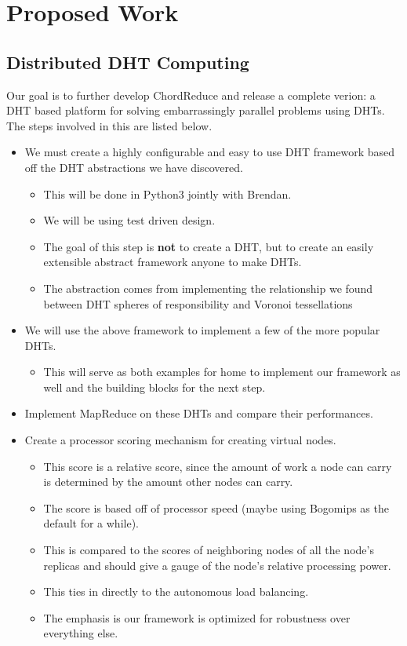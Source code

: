 \chapter{Proposed Work}
\label{chapter:experiments}

\section{Distributed DHT Computing}




Our goal is to further develop ChordReduce and release a complete verion: a DHT based platform for solving embarrassingly parallel problems using DHTs.
The steps involved in this are listed below.

\begin{itemize}
	\item We must create a highly configurable and easy to use DHT framework based off the DHT abstractions we have discovered.
	\begin{itemize}
		\item This will be done in Python3 jointly with Brendan.
		\item We will be using test driven design.
		\item The goal of this step is \textbf{not} to create a DHT, but to create an easily extensible abstract framework anyone to make DHTs.
		\item The abstraction comes from implementing the relationship we found between DHT spheres of responsibility and Voronoi tessellations
	\end{itemize}
	\item We will use the above framework to implement a few of the more popular DHTs.
	\begin{itemize}
		\item This will serve as both examples for home to implement our framework as well and the building blocks for the next step.
	\end{itemize}
	\item Implement MapReduce on these DHTs and compare their performances.
	\item Create a  processor scoring mechanism for creating virtual nodes.
	\begin{itemize}
		\item This score is a relative score, since the amount of work a node can carry is determined by the amount other nodes can carry.
		\item The score is based off of processor speed (maybe using Bogomips as the default for a while).
		\item This is compared to the scores of neighboring nodes  of all the node's replicas and should give a gauge of the node's relative processing power.
		\item This ties in directly to the autonomous load balancing.
	\end{itemize}
	\begin{itemize}
		\item The emphasis is our framework is optimized for robustness over everything else.
	\end{itemize}
	

\end{itemize}

